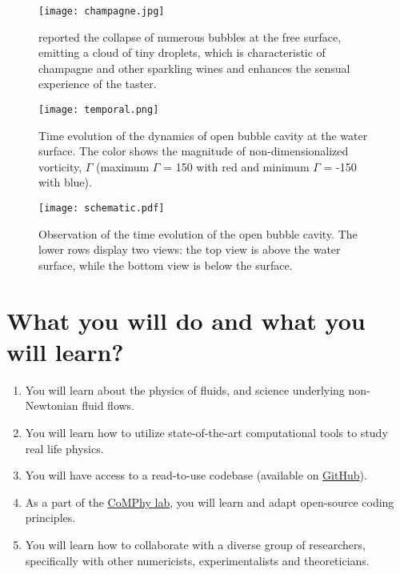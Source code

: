 \documentclass[a4paper,10pt]{article}
\begin{document}
\begin{figure}[H]
	\begin{center}
		\texttt{[image: champagne.jpg]}
		\caption{\citet{ghabache2016evaporation} reported the collapse of numerous bubbles at the free surface, emitting a cloud of tiny droplets, which is characteristic of champagne and other sparkling wines and enhances the sensual experience of the taster.}
		\label{fig:champange}
	\end{center}
\end{figure}

\begin{figure}[H]
\begin{center}
 \texttt{[image: temporal.png]}
 \caption{Time evolution of the dynamics of open bubble cavity at the water surface. The color shows the magnitude of non-dimensionalized vorticity, $\Gamma$ (maximum $\Gamma$ = 150 with red and minimum $\Gamma$ = -150 with blue).}
 \label{Figure::Typical}
\end{center}
\end{figure}


\begin{figure}[H]
\begin{center}
 \texttt{[image: schematic.pdf]}
 \caption{Observation of the time evolution of the open bubble cavity. The lower rows display two views: the top view is above the water surface, while the bottom view is below the surface. }
 \label{Figure::Waves}
\end{center}
\end{figure}
\section*{What you will do and what you will learn?}

\begin{enumerate}
\item You will learn about the physics of fluids, and science underlying non-Newtonian fluid flows. 
\item You will learn how to utilize state-of-the-art computational tools to study real life physics. 
\item You will have access to a read-to-use codebase (available on \href{https://github.com/comphy-lab/MultiRheoFlow}{GitHub}).
\item As a part of the \href{https://comphy-lab.org}{CoMPhy lab}, you will learn and adapt open-source coding principles. 
\item You will learn how to collaborate with a diverse group of researchers, specifically with other numericists, experimentalists and theoreticians.

\end{enumerate}
\end{document}
